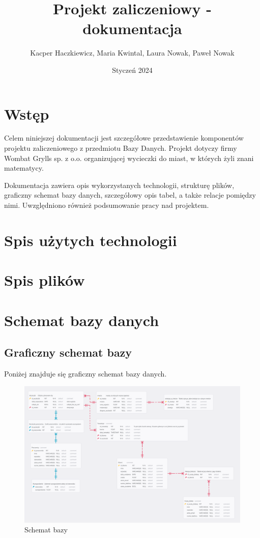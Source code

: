 \documentclass{article}
\author{Kacper Haczkiewicz, Maria Kwintal, Laura Nowak, Paweł Nowak}
\title{\textbf{Projekt zaliczeniowy - dokumentacja}}
\date{Styczeń 2024}
\begin{document}
	
	\maketitle
	
	\section{Wstęp}
	
	Celem niniejszej dokumentacji jest szczegółowe przedstawienie komponentów projektu zaliczeniowego z przedmiotu Bazy Danych. Projekt dotyczy firmy Wombat Grylls sp. z o.o. organizującej wycieczki do miast, w których żyli znani matematycy.
	
	Dokumentacja zawiera opis wykorzystanych technologii, strukturę plików, graficzny schemat bazy danych, szczegółowy opis tabel, a także relacje pomiędzy nimi. Uwzględniono również podsumowanie pracy nad projektem.
	
	\section{Spis użytych technologii}
	
	\section{Spis plików}
	
	\section{Schemat bazy danych}
	
	\subsection{Graficzny schemat bazy}
	
	Poniżej znajduje się graficzny schemat bazy danych.
	
	\begin{figure}[H]
		\centering
		\includegraphics[scale=0.2]{diagram.PNG}
		\caption{Schemat bazy}
	\end{figure}
	
\end{document}
